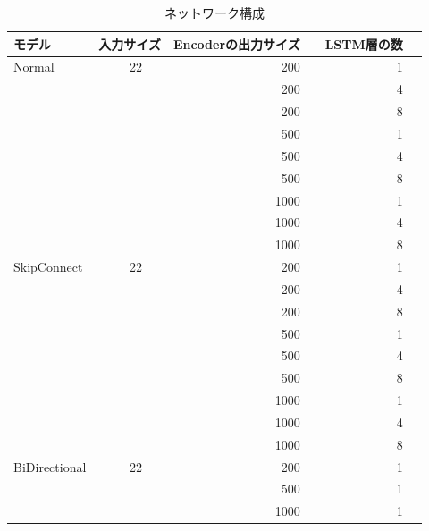 \documentclass[a4j,11pt,report]{jsbook}
\begin{document}
\begin{table}[H]
  \centering
  \caption{ネットワーク構成}
  \begingroup
  \begin{tabular}{|l|c|r|r|r|} \hline
    モデル & 入力サイズ & Encoderの出力サイズ &　LSTM層の数 \\ \hline \hline
    Normal&　22       & 200              &      1 \\
    &　         & 200              &      4 \\
    &　         & 200              &      8 \\
    &　         & 500              &      1 \\
    &　         & 500              &      4 \\
    &　         & 500              &      8 \\
    &　         & 1000             &      1 \\
    &　         & 1000             &      4 \\
    &　         & 1000             &      8 \\ \hline \hline
    SkipConnect&　22       & 200              &      1 \\
    &　         & 200              &      4 \\
    &　         & 200              &      8 \\
    &　         & 500              &      1 \\
    &　         & 500              &      4 \\
    &　         & 500              &      8 \\
    &　         & 1000             &      1 \\
    &　         & 1000             &      4 \\
    &　         & 1000             &      8 \\ \hline \hline
    BiDirectional&　22       & 200 &      1 \\
    &　         & 500              &      1 \\
    &　         & 1000             &      1 \\ \hline
  \end{tabular}
  \label{tb:network_collection}
  \endgroup
\end{table}
\end{document}
